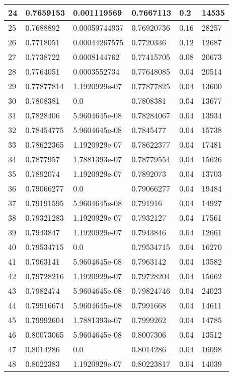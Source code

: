 \begin{longtable}{|l|l|l|l|l|l|}
24 & 0.7659153 & 0.001119569 & 0.7667113 & 0.2 & 14535 \\ \hline 
25 & 0.7688892 & 0.00059744937 & 0.76920736 & 0.16 & 28257 \\ \hline 
26 & 0.7718051 & 0.00044267575 & 0.7720336 & 0.12 & 12687 \\ \hline 
27 & 0.7738722 & 0.0008144762 & 0.77415705 & 0.08 & 20673 \\ \hline 
28 & 0.7764051 & 0.0003552734 & 0.77648085 & 0.04 & 20514 \\ \hline 
29 & 0.77877814 & 1.1920929e-07 & 0.77877825 & 0.04 & 13600 \\ \hline 
30 & 0.7808381 & 0.0 & 0.7808381 & 0.04 & 13677 \\ \hline 
31 & 0.7828406 & 5.9604645e-08 & 0.78284067 & 0.04 & 13934 \\ \hline 
32 & 0.78454775 & 5.9604645e-08 & 0.7845477 & 0.04 & 15738 \\ \hline 
33 & 0.78622365 & 1.1920929e-07 & 0.78622377 & 0.04 & 17481 \\ \hline 
34 & 0.7877957 & 1.7881393e-07 & 0.78779554 & 0.04 & 15626 \\ \hline 
35 & 0.7892074 & 1.1920929e-07 & 0.7892073 & 0.04 & 13703 \\ \hline 
36 & 0.79066277 & 0.0 & 0.79066277 & 0.04 & 19484 \\ \hline 
37 & 0.79191595 & 5.9604645e-08 & 0.791916 & 0.04 & 14927 \\ \hline 
38 & 0.79321283 & 1.1920929e-07 & 0.7932127 & 0.04 & 17561 \\ \hline 
39 & 0.7943847 & 1.1920929e-07 & 0.7943846 & 0.04 & 12661 \\ \hline 
40 & 0.79534715 & 0.0 & 0.79534715 & 0.04 & 16270 \\ \hline 
41 & 0.7963141 & 5.9604645e-08 & 0.7963142 & 0.04 & 13582 \\ \hline 
42 & 0.79728216 & 1.1920929e-07 & 0.79728204 & 0.04 & 15662 \\ \hline 
43 & 0.7982474 & 5.9604645e-08 & 0.79824746 & 0.04 & 24023 \\ \hline 
44 & 0.79916674 & 5.9604645e-08 & 0.7991668 & 0.04 & 14611 \\ \hline 
45 & 0.79992604 & 1.7881393e-07 & 0.7999262 & 0.04 & 14785 \\ \hline 
46 & 0.80073065 & 5.9604645e-08 & 0.8007306 & 0.04 & 13512 \\ \hline 
47 & 0.8014286 & 0.0 & 0.8014286 & 0.04 & 16098 \\ \hline 
48 & 0.8022383 & 1.1920929e-07 & 0.80223817 & 0.04 & 14039 \\ \hline 

\end{longtable}
